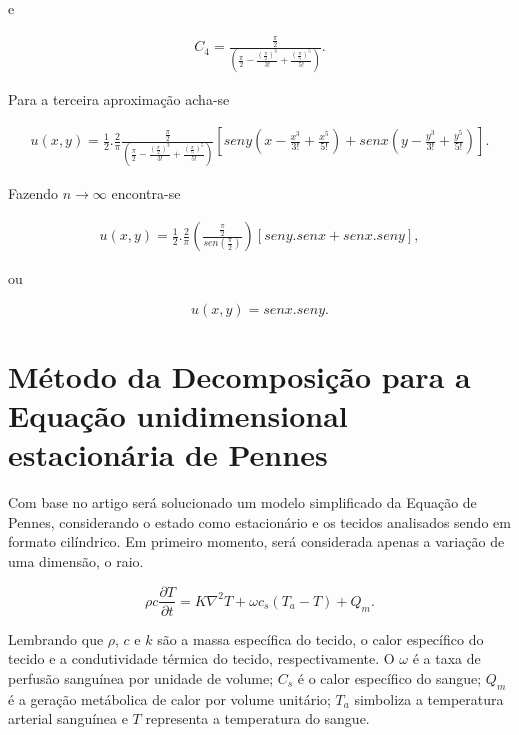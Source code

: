 e

\begin{gather}
C_{4} = \frac{\frac{\pi}{2}}{\left(\frac{\pi}{2}-\frac{(\frac{\pi}{2})^3}{3!} + \frac{(\frac{\pi}{5})^5}{5!}\right)}.
\end{gather}


Para a terceira aproximação acha-se


\begin{gather}
u(x,y) = \frac{1}{2}.\frac{2}{\pi}\frac{\frac{\pi}{2}}{\left(\frac{\pi}{2}-\frac{(\frac{\pi}{2})^3}{3!} + \frac{(\frac{\pi}{5})^5}{5!}\right)}\left[seny\left(x - \frac{x^3}{3!} + \frac{x^5}{5!}\right) + senx\left( y - \frac{y^3}{3!} + \frac{y^5}{5!}\right)\right].
\end{gather}

Fazendo $n\rightarrow \infty$ encontra-se

\begin{gather}
u(x,y) = \frac{1}{2}.\frac{2}{\pi}\left(\frac{\frac{\pi}{2}}{sen(\frac{\pi}{2})}\right)\left[seny.senx + senx.seny\right],
\end{gather}

ou 

\begin{displaymath}
u(x,y) = senx.seny.
\end{displaymath}



\chapter[Método da Decomposição para a  equação unidimensional estacionária de Pennes]{Método da Decomposição para a  Equação unidimensional estacionária de Pennes}



Com base no artigo \cite{Equacao} será solucionado um modelo simplificado da Equação de Pennes, considerando o estado como estacionário e os tecidos analisados sendo em formato cilíndrico. Em primeiro momento, será considerada apenas a variação de uma dimensão, o raio. 


  \begin{equation}\rho c\frac{\partial T}{\partial t} = K\nabla^{2}T+\omega c_{s} (T_{a}- T) + Q_{m} . \end{equation}
  
  Lembrando que $\rho$, $c$ e $k$ são a massa específica do tecido, o calor específico do tecido e a condutividade térmica do tecido, respectivamente. O $\omega$ é a taxa de perfusão sanguínea por unidade de volume; $C_{s}$ é o  calor específico do sangue; $Q_{m}$ é a geração metábolica de calor por volume unitário; $T_{a}$ simboliza a temperatura arterial sanguínea e $T$ representa a temperatura do sangue.

